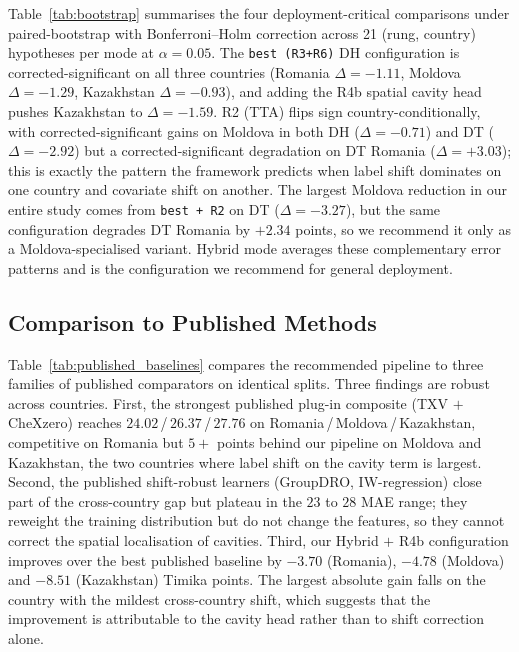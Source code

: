 \documentclass[runningheads]{llncs}
\begin{document}
Table~\ref{tab:bootstrap} summarises the four deployment-critical comparisons under paired-bootstrap with Bonferroni--Holm correction across 21 (rung, country) hypotheses per mode at $\alpha=0.05$. The \texttt{best (R3+R6)} DH configuration is corrected-significant on all three countries (Romania $\Delta=-1.11$, Moldova $\Delta=-1.29$, Kazakhstan $\Delta=-0.93$), and adding the R4b spatial cavity head pushes Kazakhstan to $\Delta=-1.59$. R2 (TTA) flips sign country-conditionally, with corrected-significant gains on Moldova in both DH ($\Delta=-0.71$) and DT ($\Delta=-2.92$) but a corrected-significant degradation on DT Romania ($\Delta=+3.03$); this is exactly the pattern the framework predicts when label shift dominates on one country and covariate shift on another. The largest Moldova reduction in our entire study comes from \texttt{best + R2} on DT ($\Delta=-3.27$), but the same configuration degrades DT Romania by $+2.34$ points, so we recommend it only as a Moldova-specialised variant. Hybrid mode averages these complementary error patterns and is the configuration we recommend for general deployment.

\subsection{Comparison to Published Methods}
\label{sec:published_compare}



Table~\ref{tab:published_baselines} compares the recommended pipeline to three families of published comparators on identical splits. Three findings are robust across countries. First, the strongest published plug-in composite (TXV $+$ CheXzero) reaches $24.02$\,/\,$26.37$\,/\,$27.76$ on Romania\,/\,Moldova\,/\,Kazakhstan, competitive on Romania but $5{+}$ points behind our pipeline on Moldova and Kazakhstan, the two countries where label shift on the cavity term is largest. Second, the published shift-robust learners (GroupDRO, IW-regression) close part of the cross-country gap but plateau in the $23$ to $28$ MAE range; they reweight the training distribution but do not change the features, so they cannot correct the spatial localisation of cavities. Third, our Hybrid $+$ R4b configuration improves over the best published baseline by $-3.70$ (Romania), $-4.78$ (Moldova) and $-8.51$ (Kazakhstan) Timika points. The largest absolute gain falls on the country with the mildest cross-country shift, which suggests that the improvement is attributable to the cavity head rather than to shift correction alone.
\end{document}

